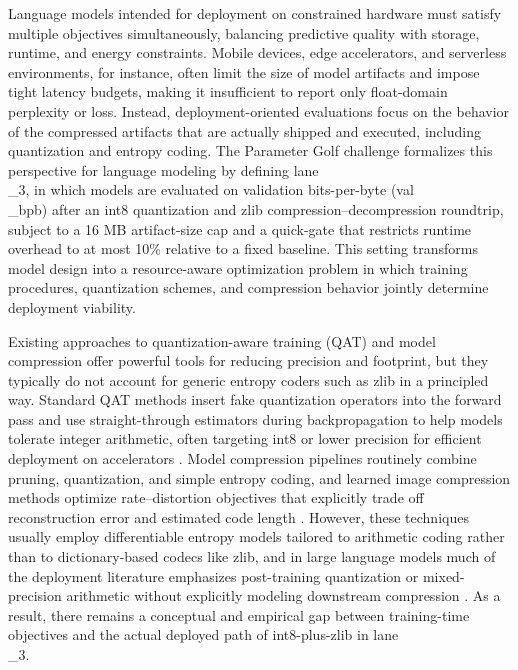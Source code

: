 \documentclass{article}
\begin{document}
Language models intended for deployment on constrained hardware must satisfy multiple objectives simultaneously, balancing predictive quality with storage, runtime, and energy constraints. Mobile devices, edge accelerators, and serverless environments, for instance, often limit the size of model artifacts and impose tight latency budgets, making it insufficient to report only float-domain perplexity or loss. Instead, deployment-oriented evaluations focus on the behavior of the compressed artifacts that are actually shipped and executed, including quantization and entropy coding. The Parameter Golf challenge formalizes this perspective for language modeling by defining lane\\_3, in which models are evaluated on validation bits-per-byte (val\\_bpb) after an int8 quantization and zlib compression--decompression roundtrip, subject to a 16 MB artifact-size cap and a quick-gate that restricts runtime overhead to at most 10\% relative to a fixed baseline. This setting transforms model design into a resource-aware optimization problem in which training procedures, quantization schemes, and compression behavior jointly determine deployment viability.

Existing approaches to quantization-aware training (QAT) and model compression offer powerful tools for reducing precision and footprint, but they typically do not account for generic entropy coders such as zlib in a principled way. Standard QAT methods insert fake quantization operators into the forward pass and use straight-through estimators during backpropagation to help models tolerate integer arithmetic, often targeting int8 or lower precision for efficient deployment on accelerators \cite{nagel2021up, jacob2018quantization, stock2019and}. Model compression pipelines routinely combine pruning, quantization, and simple entropy coding, and learned image compression methods optimize rate--distortion objectives that explicitly trade off reconstruction error and estimated code length \cite{balle2017end, minnen2018joint}. However, these techniques usually employ differentiable entropy models tailored to arithmetic coding rather than to dictionary-based codecs like zlib, and in large language models much of the deployment literature emphasizes post-training quantization or mixed-precision arithmetic without explicitly modeling downstream compression \cite{frantar2022gptq, dettmers2022llm, lin2023awq}. As a result, there remains a conceptual and empirical gap between training-time objectives and the actual deployed path of int8-plus-zlib in lane\\_3.
\end{document}

